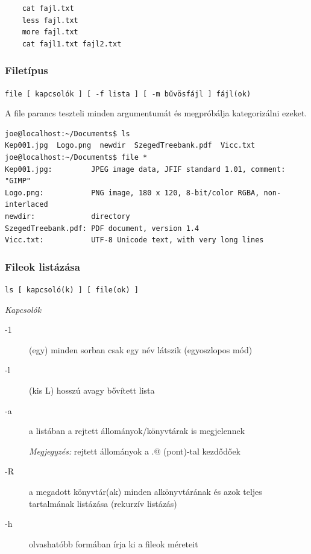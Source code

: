 	\begin{lstlisting}
	cat fajl.txt
	less fajl.txt
	more fajl.txt
	cat fajl1.txt fajl2.txt
	\end{lstlisting}


\subsubsection*{Filetípus}
	\hfill\texttt{file [ kapcsolók ] [ -f lista ] [ -m bűvösfájl ]  fájl(ok)}\medskip

A file parancs teszteli minden argumentumát és megpróbálja kategorizálni ezeket. %
\bigskip

\begin{lstlisting}
joe@localhost:~/Documents$ ls
Kep001.jpg  Logo.png  newdir  SzegedTreebank.pdf  Vicc.txt
joe@localhost:~/Documents$ file *
Kep001.jpg:         JPEG image data, JFIF standard 1.01, comment: "GIMP"
Logo.png:           PNG image, 180 x 120, 8-bit/color RGBA, non-interlaced
newdir:             directory
SzegedTreebank.pdf: PDF document, version 1.4
Vicc.txt:           UTF-8 Unicode text, with very long lines
\end{lstlisting}


\subsubsection*{Fileok listázása}
	\hfill\texttt{ls [ kapcsoló(k) ] [ file(ok) ]}
	\medskip

	\textit{Kapcsolók}
	\begin{description}
	\item[-1] (egy)  minden sorban csak egy név látszik (egyoszlopos mód)
	\item[-l]  (kis L) hosszú avagy bővített lista
	\item[-a]  a listában a rejtett állományok/könyvtárak is megjelennek 
	
		\emph{Megjegyzés:} rejtett állományok a \verb@.@ (pont)-tal kezdődőek
	\item[-R]  a megadott könyvtár(ak) minden alkönyvtárának és azok teljes tartalmának listázása (rekurzív listázás)
	\item[-h] olvashatóbb formában írja ki a fileok méreteit 
	\end{description}

